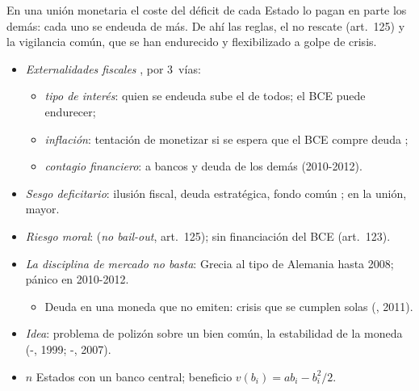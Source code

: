 \documentclass{article}
\begin{document}
\begin{columnas}
\begin{ideaclave}
En una unión monetaria el coste del déficit de cada Estado lo pagan en parte los demás: cada uno se endeuda de más. De ahí las reglas, el no rescate (art.~125) y la vigilancia común, que se han endurecido y flexibilizado a golpe de crisis.
\end{ideaclave}

\begin{itemize}
\item \emph{Externalidades fiscales} , por 3~vías:
  \begin{itemize}
  \item \emph{tipo de interés}: quien se endeuda sube el de todos; el BCE puede endurecer;
  \item \emph{inflación}: tentación de monetizar si se espera que el BCE compre deuda ;
  \item \emph{contagio financiero}: a bancos y deuda de los demás (2010-2012).
  \end{itemize}
\item \emph{Sesgo deficitario}: ilusión fiscal, deuda estratégica, fondo común ; en la unión, mayor.
\item \emph{Riesgo moral}:  (\emph{no bail-out}, art.~125); sin financiación del BCE (art.~123).
\item \emph{La disciplina de mercado no basta}: Grecia al tipo de Alemania hasta 2008; pánico en 2010-2012.
  \begin{itemize}
  \item Deuda en una moneda que no emiten: crisis que se cumplen solas (, 2011).
  \end{itemize}
\end{itemize}
\begin{itemize}
\item \emph{Idea}: problema de polizón sobre un bien común, la estabilidad de la moneda (-, 1999; -, 2007).
\end{itemize}
\begin{itemize}
\item $n$ Estados con un banco central; beneficio $v(b_i)=ab_i-b_i^2/2$.

\end{itemize}
\end{columnas}
\end{document}
